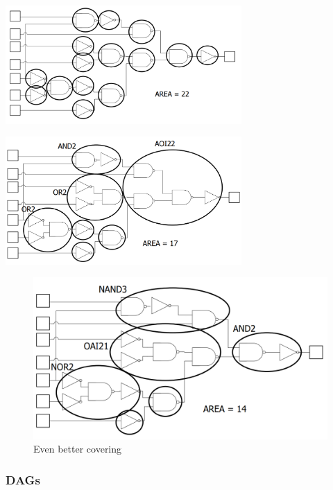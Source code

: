 \documentclass{article}
\begin{document}
\begin{minipage}[c]{0.5\textwidth}
    \centering
    \includegraphics[width=9cm, scale=1]{S6/trivialCovering.PNG}
    \captionsetup{justification=centering}
\end{minipage}%
\begin{minipage}[c]{0.5\textwidth}
    \centering
    \includegraphics[width=9cm, scale=1]{S6/betterCovering.PNG}
    \captionsetup{justification=centering}
\end{minipage}%

\begin{figure}[htp]
    \centering
    \includegraphics[width=12cm, scale=1]{S6/evenBetter.PNG}
    \caption{Even better covering}
\end{figure}

\newpage
\subsubsection{DAGs}
\end{document}
